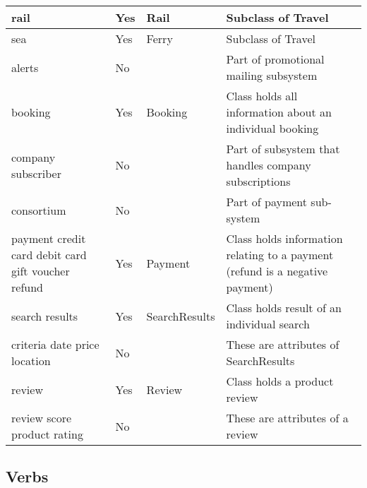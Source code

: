 \begin{longtable}{m{2.8cm} >{\centering\arraybackslash}m{1.6cm} >{\centering\arraybackslash}m{2.8cm} m{5.8cm}}
	\midrule
	rail
	& Yes & Rail & Subclass of Travel \\

	\midrule
	sea
	& Yes & Ferry & Subclass of Travel \\

	\midrule
	alerts
	& No &  & Part of promotional mailing subsystem \\

	\midrule
	booking
	& Yes & Booking & Class holds all information about an individual booking \\

	\midrule
	company \newline
	subscriber
	& No &  & Part of subsystem that handles company subscriptions \\

	\midrule
	consortium
	& No &  & Part of payment sub-system \\

	\midrule
	payment \newline
	credit card \newline
	debit card \newline
	gift voucher \newline
	refund
	& Yes & Payment & Class holds information relating to a payment (refund is a negative payment) \\

	\midrule
	search results
	& Yes & SearchResults & Class holds result of an individual search \\

	\midrule
	criteria \newline
	date \newline
	price \newline
	location
	& No &  & These are attributes of SearchResults \\

	\midrule
	review
	& Yes & Review & Class holds a product review \\

	\midrule
	review score \newline
	product rating & No &  & These are attributes of a review \\
	\bottomrule
\end{longtable}

\subsection{Verbs}

